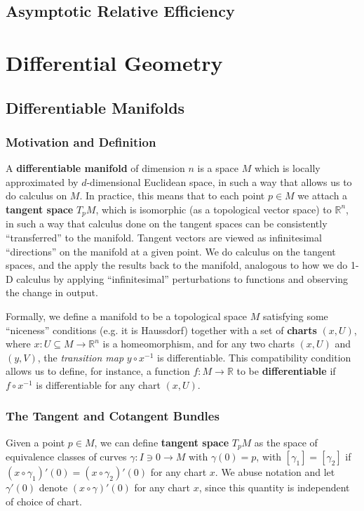 \documentclass[reqno]{amsart}
\numberwithin{equation}{section}
\begin{document}
\subsection{Asymptotic Relative Efficiency}

\section{Differential Geometry}
\subsection{Differentiable Manifolds}
\subsubsection{Motivation and Definition}
A \textbf{differentiable manifold} of dimension $n$ is a space $M$ which is locally approximated by $d$-dimensional
Euclidean space, in such a way that allows us to do calculus on $M$. In practice, this means that to each point
$p \in M$ we attach a \textbf{tangent space} $T_pM$, which is isomorphic (as a topological vector space) to
$\mathbb R^n$, in such a way that calculus done on the tangent spaces can be consistently ``transferred'' to
the manifold. Tangent vectors are viewed as infinitesimal ``directions'' on the manifold at a given point.
We do calculus on the tangent spaces, and the apply the results back to the manifold, analogous
to how we do 1-D calculus by applying ``infinitesimal'' perturbations to functions and observing the change in output.

Formally, we define a manifold to be a topological space $M$ satisfying some ``niceness'' conditions
(e.g. it is Haussdorf) together with a set of \textbf{charts} $(x, U)$, where $x : U \subseteq M \to \mathbb R^n$
is a homeomorphism, and for any two charts $(x, U)$ and $(y, V)$, the \emph{transition map}
$y \circ x^{-1}$ is differentiable. This compatibility condition allows us to define, for
instance, a function $f: M \to \mathbb R$ to be \textbf{differentiable} if $f \circ x^{-1}$ is differentiable for
any chart $(x, U)$.

\subsubsection{The Tangent and Cotangent Bundles}

Given a point $p \in M$, we can define \textbf{tangent space} $T_pM$
as the space of equivalence classes of curves $\gamma : I \ni 0 \to M$ with
$\gamma(0) = p$, with $[\gamma_1] = [\gamma_2]$ if $(x \circ \gamma_1)'(0) = (x \circ \gamma_2)'(0)$
for any chart $x$. We abuse notation and let $\gamma'(0)$ denote $(x \circ \gamma)'(0)$ for any chart $x$,
since this quantity is independent of choice of chart.
\end{document}
